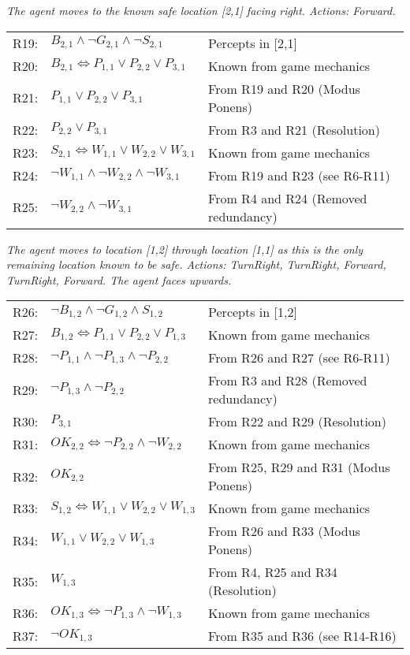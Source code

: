 \begin{enumerate}
\textit{The agent moves to the known safe location [2,1] facing right. Actions: Forward.}

\begin{longtable}{rll}
R19: & \underline{$B_{2,1} \land \neg G_{2,1} \land \neg S_{2,1}$} & Percepts in [2,1] \\
R20: & $B_{2,1} \Leftrightarrow P_{1,1} \lor P_{2,2} \lor P_{3,1}$ & Known from game mechanics \\
R21: & $P_{1,1} \lor P_{2,2} \lor P_{3,1}$ & From R19 and R20 (Modus Ponens) \\
R22: & \underline{$P_{2,2} \lor P_{3,1}$} & From R3 and R21 (Resolution) \\
R23: & $S_{2,1} \Leftrightarrow W_{1,1} \lor W_{2,2} \lor W_{3,1}$ & Known from game mechanics \\
R24: & $\neg W_{1,1} \land \neg W_{2,2} \land \neg W_{3,1}$ & From R19 and R23 (see R6-R11) \\
R25: & \underline{$\neg W_{2,2} \land \neg W_{3,1}$} & From R4 and R24 (Removed redundancy) \\
\end{longtable}
\addtocounter{table}{-1}

\textit{The agent moves to location [1,2] through location [1,1] as this is the only remaining location known to be safe. Actions: TurnRight, TurnRight, Forward, TurnRight, Forward. The agent faces upwards.}

\begin{longtable}{rll}
R26: & \underline{$\neg B_{1,2} \land \neg G_{1,2} \land S_{1,2}$} & Percepts in [1,2] \\
R27: & $B_{1,2} \Leftrightarrow P_{1,1} \lor P_{2,2} \lor P_{1,3}$ & Known from game mechanics \\
R28: & $\neg P_{1,1} \land \neg P_{1,3} \land \neg P_{2,2}$ & From R26 and R27 (see R6-R11) \\ 
R29: & \underline{$\neg P_{1,3} \land \neg P_{2,2}$} & From R3 and R28 (Removed redundancy) \\
R30: & \underline{$P_{3,1}$} & From R22 and R29 (Resolution) \\
R31: & $OK_{2,2} \Leftrightarrow \neg P_{2,2} \land \neg W_{2,2}$ & Known from game mechanics \\
R32: & \underline{$OK_{2,2}$} & From R25, R29 and R31 (Modus Ponens) \\
R33: & $S_{1,2} \Leftrightarrow W_{1,1} \lor W_{2,2} \lor W_{1,3}$ & Known from game mechanics \\
R34: & $W_{1,1} \lor W_{2,2} \lor W_{1,3}$ & From R26 and R33 (Modus Ponens) \\
R35: & \underline{$W_{1,3}$} & From R4, R25 and R34 (Resolution) \\
R36: & $OK_{1,3} \Leftrightarrow \neg P_{1,3} \land \neg W_{1,3}$ & Known from game mechanics \\
R37: & \underline{$\neg OK_{1,3}$} & From R35 and R36 (see R14-R16) \\
\end{longtable}
\addtocounter{table}{-1}


\end{enumerate}
